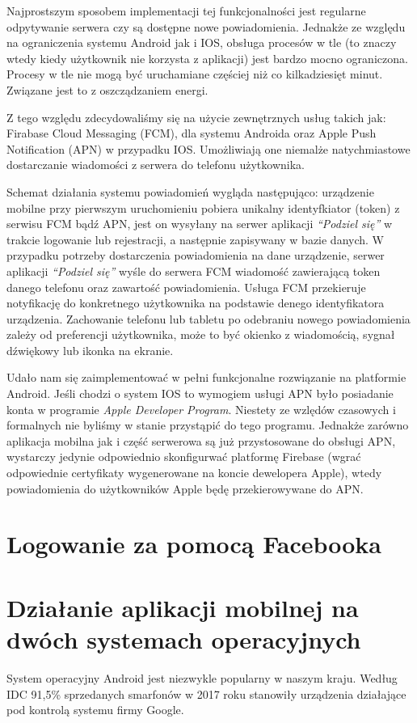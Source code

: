 \documentclass[licencjacka]{pracamgr}
\begin{document}
Najprostszym sposobem implementacji tej funkcjonalności jest regularne odpytywanie serwera czy są dostępne nowe powiadomienia. Jednakże ze względu na ograniczenia systemu Android jak i IOS, obsługa procesów w tle (to znaczy wtedy kiedy użytkownik nie korzysta z aplikacji) jest bardzo mocno ograniczona. Procesy w tle nie mogą być uruchamiane częściej niż co kilkadziesięt minut. Związane jest to z oszcządzaniem energi.

Z tego względu zdecydowaliśmy się na użycie zewnętrznych usług takich jak: Firabase Cloud Messaging (FCM), dla systemu Androida oraz Apple Push Notification (APN) w przypadku IOS. Umożliwiają one niemalże natychmiastowe dostarczanie wiadomości z serwera do telefonu użytkownika.

Schemat działania systemu powiadomień wygląda następująco: urządzenie mobilne przy pierwszym uruchomieniu pobiera unikalny identyfkiator (token) z serwisu FCM bądź APN, jest on wysyłany na serwer aplikacji \textit{``Podziel się''} w trakcie logowanie lub rejestracji, a następnie zapisywany w bazie danych. W przypadku potrzeby dostarczenia powiadomienia na dane urządzenie, serwer aplikacji \textit{``Podziel się''} wyśle do serwera FCM wiadomość zawierającą token danego telefonu oraz zawartość powiadomienia. Usługa FCM przekieruje notyfikację do konkretnego użytkownika na podstawie denego identyfikatora urządzenia. Zachowanie telefonu lub tabletu po odebraniu nowego powiadomienia zależy od preferencji użytkownika, może to być okienko z wiadomością, sygnał dźwiękowy lub ikonka na ekranie.

Udało nam się zaimplementować w pełni funkcjonalne rozwiązanie na platformie Android. Jeśli chodzi o system IOS to wymogiem usługi APN było posiadanie konta w programie \textit{Apple Developer Program}. Niestety ze wzlędów czasowych i formalnych nie byliśmy w stanie przystąpić do tego programu. Jednakże zarówno aplikacja mobilna jak i część serwerowa są już przystosowane do obsługi APN, wystarczy jedynie odpowiednio skonfigurwać platformę Firebase (wgrać odpowiednie certyfikaty wygenerowane na koncie dewelopera Apple), wtedy powiadomienia do użytkowników Apple będę przekierowywane do APN.  

\section{Logowanie za pomocą Facebooka}

\section{Działanie aplikacji mobilnej na dwóch systemach operacyjnych} 
System operacyjny Android jest niezwykle popularny w naszym kraju. Według IDC 91,5\% sprzedanych smarfonów w 2017 roku stanowiły urządzenia działające pod kontrolą systemu firmy Google.
\end{document}
